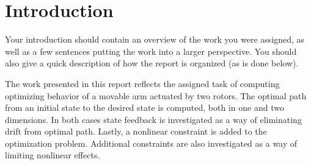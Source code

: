 \section{Introduction}

Your introduction should contain an overview of the work you were assigned, as well as a few sentences putting the work into a larger perspective. You should also give a quick description of how the report is organized (as is done below).


The work presented in this report reflects the assigned task of computing optimizing behavior of a movable arm actuated by two rotors. The optimal path from an initial state to the desired state is computed, both in one and two dimensions. In both cases state feedback is investigated as a way of eliminating drift from optimal path. Lastly, a nonlinear constraint is added to the optimization problem. Additional constraints are also investigated as a way of limiting nonlinear effects.
